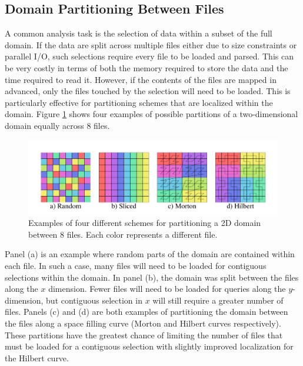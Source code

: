 \documentclass[apjl]{emulateapj}
\newcommand{\todo}[1]{{\color{red}{#1}}}
\newcommand{\addref}{{\color{red}(ref. needed)}}
\begin{document}
\subsection{Domain Partitioning Between Files}\label{SS:decomp}
A common analysis task is the selection of data within a subset of the full domain. If the data are split across multiple files either due to size constraints or parallel I/O, such selections require every file to be loaded and parsed. This can be very costly in terms of both the memory required to store the data and the time required to read it. However, if the contents of the files are mapped in advanced, only the files touched by the selection will need to be loaded. This is particularly effective for partitioning schemes that are localized within the domain. Figure \ref{fig:files} shows four examples of possible partitions of a two-dimensional domain equally across 8 files. 
%
\begin{figure}[htbp]
\begin{center}
\includegraphics[width=\columnwidth,keepaspectratio]{../images/files.png}
\caption{Examples of four different schemes for partitioning a 2D domain between 8 files. Each color represents a different file.}
\label{fig:files}
\end{center}
\end{figure}
%

Panel (a) is an example where random parts of the domain are contained within each file. In such a case, many files will need to be loaded for contiguous selections within the domain. In panel (b), the domain was split between the files along the $x$ dimension. Fewer files will need to be loaded for queries along the $y$-dimension, but contiguous selection in $x$ will still require a greater number of files. Panels (c) and (d) are both examples of partitioning the domain between the files along a space filling curve (Morton and Hilbert curves respectively). These partitions have the greatest chance of limiting the number of files that must be loaded for a contiguous selection with slightly improved localization for the Hilbert curve. \todo{Examples of use cases \addref.}
\end{document}

